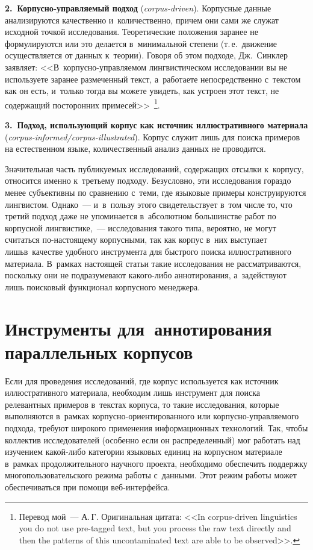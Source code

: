 \begin{multicols}{2}
\textbf{2.~Корпусно-управляемый подход} (\textit{corpus-driven}). 
Корпусные данные анализируются качественно и~количественно, причем они 
сами же служат исходной точкой исследования. Теоретические положения 
заранее не формулируются или это делается в~минимальной степени (т.\,е.\ 
движение осуществляется от данных к~теории). Говоря об этом подходе, 
Дж.~Синклер заявляет: <<В~кор\-пус\-но-управ\-ля\-емом лингвистическом 
исследовании вы не используете заранее размеченный текст, а~работаете 
непосредственно с~текстом как он есть, и~только тогда вы можете увидеть, 
как устроен этот текст, не содержащий посторонних 
примесей>>~\cite[c.~191]{14-gon}\footnote{Перевод мой~--- А.\,Г. Оригинальная 
цитата: <<In corpus-driven linguistics you do not use pre-tagged text, but you process the raw text 
directly and then the patterns of this uncontaminated text are able to be observed>>.}.

\textbf{3.\ Подход, использующий корпус как источник иллюстративного 
материала} (\textit{corpus-informed/corpus-illustrated}). Корпус служит лишь 
для поиска примеров на естественном языке, количественный анализ данных 
не проводится.

Значительная часть публикуемых исследований, содержащих отсылки к~корпусу, относится именно к~третьему подходу. Безусловно, эти 
исследования гораздо менее субъективны по сравнению с~теми, где языковые 
примеры конструируются лингвистом. Однако~--- и~в~пользу этого 
свидетельствует в~том числе то, что третий подход даже не упоминается 
в~абсолютном большинстве работ по корпусной лингвистике,~--- 
исследования такого типа, вероятно, не могут считаться по-на\-сто\-яще\-му 
корпусными, так как корпус в~них выступает лишь\linebreak в~качестве удобного 
инструмента для быстрого поиска иллюстративного материала. В~рамках 
настоящей статьи такие исследования не рассматриваются, поскольку они не 
подразумевают \mbox{ка\-ко\-го-ли\-бо} аннотирования, а~задействуют лишь 
поисковый функционал корпусного менеджера.

\section{Инструменты для~аннотирования параллельных корпусов}

Если для проведения исследований, где корпус используется как источник 
иллюстративного материала, необходим лишь инструмент для поиска 
релевантных примеров в~текстах корпуса, то такие исследования, которые 
выполняются в~рамках кор\-пус\-но-ори\-ен\-ти\-ро\-ван\-но\-го или  
кор\-пус\-но-управ\-ля\-емо\-го подхода, требуют широкого применения 
информационных технологий. Так, чтобы коллектив исследователей 
(особенно если он распределенный) мог работать над изучением  
ка\-кой-ли\-бо категории языковых единиц на корпусном материале в~рамках 
продолжительного научного проекта, необходимо обеспечить поддержку 
многопользовательского режима работы с~данными. Этот режим работы 
может обеспечиваться при помощи веб-ин\-тер\-фейса.


\end{multicols}
